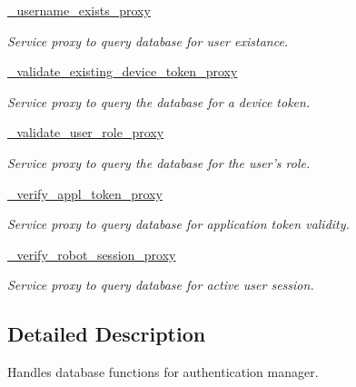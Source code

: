 \begin{DoxyCompactItemize}
\hyperlink{classrapp__application__authentication__manager_1_1database__handler_1_1DatabaseHandler_a4cfb9a393dc0fbe21f0985e02c36d60c}{\-\_\-username\-\_\-exists\-\_\-proxy}
\begin{DoxyCompactList}\small\item\em Service proxy to query database for user existance. \end{DoxyCompactList}\item 
\hyperlink{classrapp__application__authentication__manager_1_1database__handler_1_1DatabaseHandler_a686fd3a9b7d9426454dfd1471dd6db6c}{\-\_\-validate\-\_\-existing\-\_\-device\-\_\-token\-\_\-proxy}
\begin{DoxyCompactList}\small\item\em Service proxy to query the database for a device token. \end{DoxyCompactList}\item 
\hyperlink{classrapp__application__authentication__manager_1_1database__handler_1_1DatabaseHandler_a2c43b89eb219c26dac8f04bb2fc1701b}{\-\_\-validate\-\_\-user\-\_\-role\-\_\-proxy}
\begin{DoxyCompactList}\small\item\em Service proxy to query the database for the user's role. \end{DoxyCompactList}\item 
\hyperlink{classrapp__application__authentication__manager_1_1database__handler_1_1DatabaseHandler_ae21e898efe1a1b6bcc6ce73b008459e1}{\-\_\-verify\-\_\-appl\-\_\-token\-\_\-proxy}
\begin{DoxyCompactList}\small\item\em Service proxy to query database for application token validity. \end{DoxyCompactList}\item 
\hyperlink{classrapp__application__authentication__manager_1_1database__handler_1_1DatabaseHandler_a9e58d8759993da8626073ecc804638df}{\-\_\-verify\-\_\-robot\-\_\-session\-\_\-proxy}
\begin{DoxyCompactList}\small\item\em Service proxy to query database for active user session. \end{DoxyCompactList}\end{DoxyCompactItemize}


\subsection{Detailed Description}
Handles database functions for authentication manager. 


